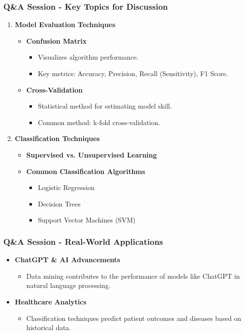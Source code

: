 \documentclass[aspectratio=169]{beamer}
\begin{document}
\begin{frame}[fragile]
    \frametitle{Q\&A Session - Key Topics for Discussion}
    \begin{enumerate}
        \item \textbf{Model Evaluation Techniques}
            \begin{itemize}
                \item \textbf{Confusion Matrix}
                \begin{itemize}
                    \item Visualizes algorithm performance.
                    \item Key metrics: Accuracy, Precision, Recall (Sensitivity), F1 Score.
                \end{itemize}
                \item \textbf{Cross-Validation}
                \begin{itemize}
                    \item Statistical method for estimating model skill.
                    \item Common method: k-fold cross-validation.
                \end{itemize}
            \end{itemize}
        \item \textbf{Classification Techniques}
            \begin{itemize}
                \item \textbf{Supervised vs. Unsupervised Learning}
                \item \textbf{Common Classification Algorithms}
                \begin{itemize}
                    \item Logistic Regression
                    \item Decision Trees
                    \item Support Vector Machines (SVM)
                \end{itemize}
            \end{itemize}
    \end{enumerate}
\end{frame}

\begin{frame}[fragile]
    \frametitle{Q\&A Session - Real-World Applications}
    \begin{itemize}
        \item \textbf{ChatGPT \& AI Advancements}
        \begin{itemize}
            \item Data mining contributes to the performance of models like ChatGPT in natural language processing.
        \end{itemize}
        \item \textbf{Healthcare Analytics}
        \begin{itemize}
            \item Classification techniques predict patient outcomes and diseases based on historical data.
        \end{itemize}
    \end{itemize}
\end{frame}
\end{document}
